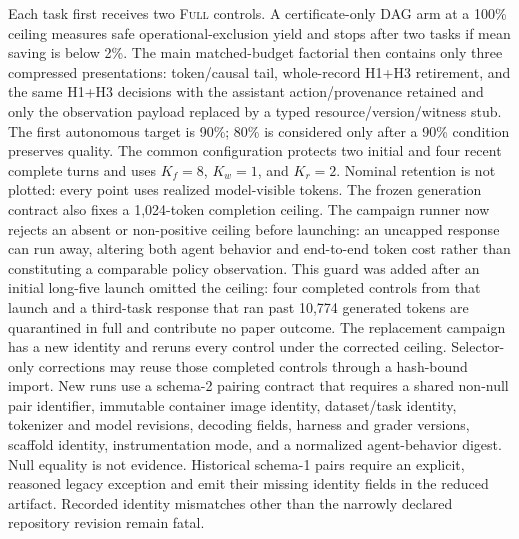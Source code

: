 \documentclass[11pt]{article}
\begin{document}
Each task first receives two \textsc{Full} controls. A certificate-only DAG arm
at a 100\% ceiling measures safe operational-exclusion yield and stops after
two tasks if mean saving is below 2\%. The main matched-budget factorial then
contains only three compressed presentations: token/causal tail, whole-record
H1+H3 retirement, and the same H1+H3 decisions with the assistant
action/provenance retained and only the observation payload replaced by a typed
resource/version/witness stub. The first autonomous target is 90\%; 80\% is
considered only after a 90\% condition preserves quality. The common
configuration protects two initial and four recent complete turns and uses
$K_f=8$, $K_w=1$, and $K_r=2$. Nominal retention is not plotted: every point
uses realized model-visible tokens. The frozen generation contract
also fixes a 1,024-token completion ceiling.  The campaign runner now rejects
an absent or non-positive ceiling before launching: an uncapped response can
run away, altering both agent behavior and end-to-end token cost rather than
constituting a comparable policy observation.
This guard was added after an initial long-five launch omitted the ceiling:
four completed controls from that launch and a third-task response that ran
past 10,774 generated tokens are quarantined in full and contribute no paper
outcome.  The replacement campaign has a new identity and reruns every
control under the corrected ceiling. Selector-only corrections may reuse those
completed controls through a hash-bound import. New runs use a schema-2 pairing
contract that requires a shared non-null pair identifier, immutable container
image identity, dataset/task identity, tokenizer and model revisions, decoding
fields, harness and grader versions, scaffold identity, instrumentation mode,
and a normalized agent-behavior digest. Null equality is not evidence.
Historical schema-1 pairs require an explicit, reasoned legacy exception and
emit their missing identity fields in the reduced artifact. Recorded identity
mismatches other than the narrowly declared repository revision remain fatal.
\end{document}
